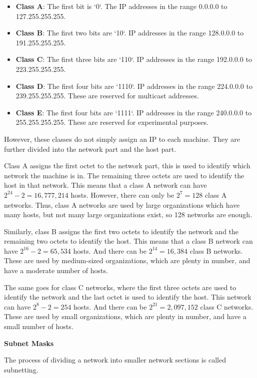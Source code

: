 \begin{itemize}
\item \textbf{Class A}: The first bit is `0`. The
IP addresses in the range 0.0.0.0 to 127.255.255.255.
\item \textbf{Class B}: The first two bits are `10`.
IP addresses in the range 128.0.0.0 to 191.255.255.255.
\item \textbf{Class C}: The first three bits are `110`.
IP addresses in the range 192.0.0.0 to 223.255.255.255.
\item \textbf{Class D}: The first four bits are `1110`.
IP addresses in the range 224.0.0.0 to 239.255.255.255.
These are reserved for multicast addresses.
\item \textbf{Class E}: The first four bits are `1111`.
IP addresses in the range 240.0.0.0 to 255.255.255.255.
These are reserved for experimental purposes.
\end{itemize}

However, these classes do not simply assign an IP to
each machine. They are further divided into the
network part and the host part.

Class A assigns the first octet to the network part,
this is used to identify which network the machine
is in. The remaining three octets are used to identify
the host in that network. This means that a class A
network can have $2^{24} - 2 = 16,777,214$ hosts.
However, there can only be $2^{7} = 128$ class A
networks. Thus, class A networks are used by large
organizations which have many hosts, but not many
large organizations exist, so 128 networks are enough.

Similarly, class B assigns the first two octets to
identify the network and the remaining two octets
to identify the host. This means that a class B
network can have $2^{16} - 2 = 65,534$ hosts.
And there can be $2^{14} = 16,384$ class B networks.
These are used by medium-sized organizations, which
are plenty in number, and have a moderate number of
hosts.

The same goes for class C networks, where the first
three octets are used to identify the network and
the last octet is used to identify the host. This
network can have $2^{8} - 2 = 254$ hosts. And there
can be $2^{21} = 2,097,152$ class C networks. These
are used by small organizations, which are plenty
in number, and have a small number of hosts.

\textbf{Subnet Masks}

\begin{definition}[Subnetting]
The process of dividing a network into smaller network
sections is called subnetting.
\end{definition}

